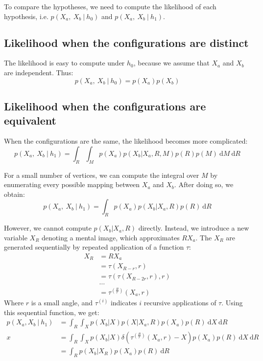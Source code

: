 \documentclass{article} %
\begin{document}
To compare the hypotheses, we need to compute the likelihood of each
hypothesis, i.e. $p(X_a,\ X_b\ \vert \ h_0)$ and $p(X_a,\ X_b\ \vert \
h_1)$.

\subsection{Likelihood when the configurations are distinct}

The likelihood is easy to compute under $h_0$, because we assume that
$X_a$ and $X_b$ are independent. Thus:
\begin{equation}
  p(X_a,\ X_b\ \vert \ h_0)=p(X_a)p(X_b)
\end{equation}

\subsection{Likelihood when the configurations are equivalent}

When the configurations are the same, the likelihood becomes more
complicated:
\begin{equation} 
  p(X_a,\ X_b\ \vert \ h_1)=\int_R\int_M p(X_a) p(X_b\vert X_a,R,M) p(R) p(M)\ \mathrm{d}M\ \mathrm{d}R
\end{equation}

For a small number of vertices, we can compute the integral over $M$
by enumerating every possible mapping between $X_a$ and $X_b$. After
doing so, we obtain:
\begin{equation} 
  p(X_a,\ X_b\ \vert \ h_1)=\int_R p(X_a) p(X_b\vert X_a,R) p(R)\ \mathrm{d}R
\end{equation}

However, we cannot compute $p(X_b\vert X_a, R)$ directly. Instead, we
introduce a new variable $X_R$ denoting a mental image, which
approximates $RX_a$. The $X_R$ are generated sequentially by repeated
application of a function $\tau$:
\begin{align*}
  X_R&=RX_a\\
  &=\tau(X_{R-r}, r)\\
  &=\tau(\tau(X_{R-2r}, r), r)\\
  &\ldots{}\\
  &=\tau^{(\frac{R}{r})}(X_a, r)
\end{align*} 
Where $r$ is a small angle, and $\tau^{(i)}$ indicates $i$ recursive
applications of $\tau$. Using this sequential function, we get:
\begin{align}
  p(X_a, X_b\ \vert \ h_1)&=\int_R \int_{X} p(X_b\vert X) p(X\vert X_a, R)p(X_a)p(R)\ \mathrm{d}X\ \mathrm{d}R \nonumber \\
  x&= \int_R \int_X p(X_b\vert X)\delta(\tau^{(\frac{R}{r})}(X_a, r)-X)p(X_a)p(R)\ \mathrm{d}X\ \mathrm{d}R \nonumber \\
  &= \int_R p(X_b\vert X_R)p(X_a)p(R)\ \mathrm{d}R
\end{align}
\end{document}
